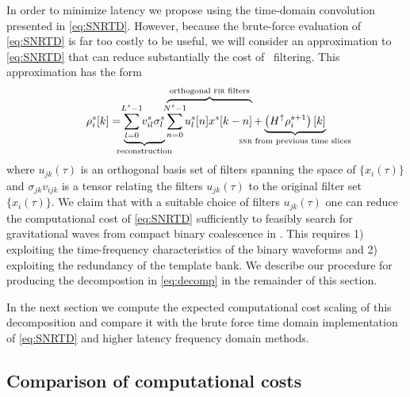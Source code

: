 %
In order to minimize latency we propose using the time-domain convolution
presented in \eqref{eq:SNRTD}.  However, because the brute-force evaluation of
\eqref{eq:SNRTD} is far too costly to be useful, we will consider an
approximation to \eqref{eq:SNRTD} that can reduce substantially the cost of
\realtime\ filtering. This approximation has the form
%
%
\begin{equation}
	\rho_i^s [k] =%
		\underbrace{
			\sum_{\mathclap{l=0}}^{\mathclap{L^s-1}} v_{il}^s \sigma_l^s
		}_\textrm{\clap{reconstruction}}
		\overbrace{
			\sum_{\mathclap{n=0}}^{\mathclap{N^s-1}} u_l^s[n] x^s[k-n]
		}^\textrm{\clap{orthogonal {\sc fir} filters}}
		+
		\underbrace{
			\left(H^\uparrow \rho_i^{s+1}\right)[k]
		}_\textrm{\clap{{\sc snr} from previous time slices}}
\end{equation}
%
%
where $u_{jk}(\tau)$ is an orthogonal basis set of filters spanning the space
of $\{x_i(\tau)\}$ and $\sigma_{jk} v_{ijk}$ is a tensor relating the filters
$u_{jk}(\tau)$ to the original filter set $\{x_i(\tau)\}$.  We claim that with
a suitable choice of filters $u_{jk}(\tau)$ one can reduce the computational
cost of \eqref{eq:SNRTD} sufficiently to feasibly search for
gravitational waves from compact binary coalescence in \realtime.  This
requires 1) exploiting
the time-frequency characteristics of the binary waveforms and 2) exploiting the redundancy of the template bank. We describe our
procedure for producing the decompostion in \eqref{eq:decomp} in the remainder
of this section.

In the next section we compute the expected computational cost scaling of this
decomposition and compare it with the brute force time domain implementation of
\eqref{eq:SNRTD} and higher latency frequency domain methods.

\subsection{Comparison of computational costs}

